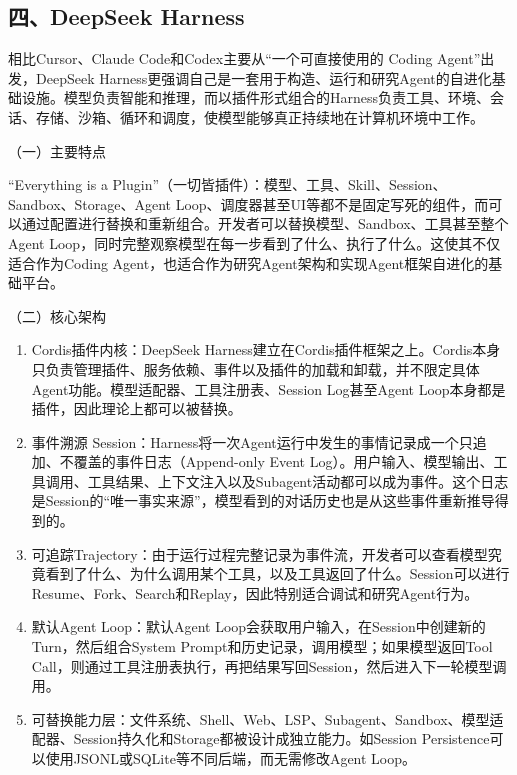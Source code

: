 \hypertarget{ux56dbdeepseek-harness}{%
\subsection{四、DeepSeek Harness}\label{ux56dbdeepseek-harness}}

相比Cursor、Claude Code和Codex主要从``一个可直接使用的 Coding Agent''出发，DeepSeek Harness更强调自己是一套用于构造、运行和研究Agent的自进化基础设施。模型负责智能和推理，而以插件形式组合的Harness负责工具、环境、会话、存储、沙箱、循环和调度，使模型能够真正持续地在计算机环境中工作。

（一）主要特点

``Everything is a Plugin''（一切皆插件）：模型、工具、Skill、Session、Sandbox、Storage、Agent Loop、调度器甚至UI等都不是固定写死的组件，而可以通过配置进行替换和重新组合。开发者可以替换模型、Sandbox、工具甚至整个Agent Loop，同时完整观察模型在每一步看到了什么、执行了什么。这使其不仅适合作为Coding Agent，也适合作为研究Agent架构和实现Agent框架自进化的基础平台。

（二）核心架构

\begin{enumerate}
\def\labelenumi{\arabic{enumi}.}
\item
  Cordis插件内核：DeepSeek Harness建立在Cordis插件框架之上。Cordis本身只负责管理插件、服务依赖、事件以及插件的加载和卸载，并不限定具体Agent功能。模型适配器、工具注册表、Session Log甚至Agent Loop本身都是插件，因此理论上都可以被替换。
\item
  事件溯源 Session：Harness将一次Agent运行中发生的事情记录成一个只追加、不覆盖的事件日志（Append-only Event Log）。用户输入、模型输出、工具调用、工具结果、上下文注入以及Subagent活动都可以成为事件。这个日志是Session的``唯一事实来源''，模型看到的对话历史也是从这些事件重新推导得到的。
\item
  可追踪Trajectory：由于运行过程完整记录为事件流，开发者可以查看模型究竟看到了什么、为什么调用某个工具，以及工具返回了什么。Session可以进行Resume、Fork、Search和Replay，因此特别适合调试和研究Agent行为。
\item
  默认Agent Loop：默认Agent Loop会获取用户输入，在Session中创建新的Turn，然后组合System Prompt和历史记录，调用模型；如果模型返回Tool Call，则通过工具注册表执行，再把结果写回Session，然后进入下一轮模型调用。
\item
  可替换能力层：文件系统、Shell、Web、LSP、Subagent、Sandbox、模型适配器、Session持久化和Storage都被设计成独立能力。如Session Persistence可以使用JSONL或SQLite等不同后端，而无需修改Agent Loop。
\end{enumerate}

